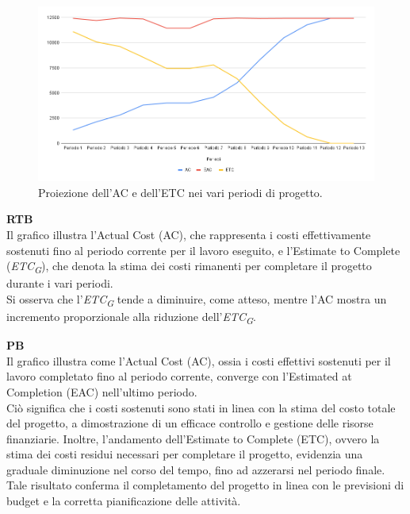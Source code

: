 \vspace{0.3cm}

\begin{figure}[H]
    \centering
    \includegraphics[width=1\textwidth]{../Images/PianoDiQualifica/AC_ETC.png}
    \caption{Proiezione dell’AC e dell’ETC nei vari periodi di progetto.}
    \label{fig:4}
\end{figure}

\vspace{0.2cm}

\textbf{RTB} \\
Il grafico illustra l'Actual Cost (AC), che rappresenta i costi effettivamente sostenuti fino al periodo corrente per il lavoro eseguito, e l'Estimate to Complete (\textit{ETC}\textsubscript{\textit{G}}), che denota la stima dei costi rimanenti per completare il progetto durante i vari periodi. \\
Si osserva che l'\textit{ETC}\textsubscript{\textit{G}} tende a diminuire, come atteso, mentre l'AC mostra un incremento proporzionale alla riduzione dell'\textit{ETC}\textsubscript{\textit{G}}.

\vspace{0.3cm}

\textbf{PB} \\
Il grafico illustra come l'Actual Cost (AC), ossia i costi effettivi sostenuti per il lavoro completato fino al periodo corrente, converge con l'Estimated at Completion (EAC) nell'ultimo periodo. \\
Ciò significa che i costi sostenuti sono stati in linea con la stima del costo totale del progetto, a dimostrazione di un efficace controllo e gestione delle risorse finanziarie. Inoltre, l'andamento dell'Estimate to Complete (ETC), ovvero la stima dei costi residui necessari per completare il progetto, evidenzia una graduale diminuzione nel corso del tempo, fino ad azzerarsi nel periodo finale. \\
Tale risultato conferma il completamento del progetto in linea con le previsioni di budget e la corretta pianificazione delle attività.

